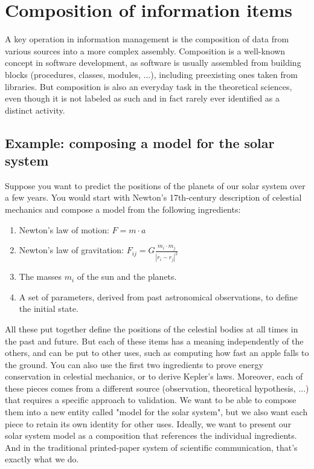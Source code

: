 \section{Composition of information items}
\label{composition}

A key operation in information management is the composition of data from various sources into a more complex assembly. Composition is a well-known concept in software development, as software is usually assembled from building blocks (procedures, classes, modules, ...), including preexisting ones taken from libraries. But composition is also an everyday task in the theoretical sciences, even though it is not labeled as such and in fact rarely ever identified as a distinct activity.

\subsection{Example: composing a model for the solar system}

Suppose you want to predict the positions of the planets of our solar system over a few years. You would start with Newton's 17th-century description of celestial mechanics and compose a model from the following ingredients:

\begin{enumerate}
\item Newton's law of motion:
      $F = m \cdot a$
\item Newton's law of gravitation:
      $F_{ij} = G \frac{m_i \cdot m_j}{|r_i-r_j|^2}$
\item The masses $m_i$ of the sun and the planets.
\item A set of parameters, derived from past astronomical observations, to define the initial state.
\setcounter{myCounter}{\theenumi}
\end{enumerate}

All these put together define the positions of the celestial bodies at all times in the past and future. But each of these items has a meaning independently of the others, and can be put to other uses, such as computing how fast an apple falls to the ground. You can also use the first two ingredients to prove energy conservation in celestial mechanics, or to derive Kepler's laws. Moreover, each of these pieces comes from a different source (observation, theoretical hypothesis, ...) that requires a specific approach to validation. We want to be able to compose them into a new entity called "model for the solar system", but we also want each piece to retain its own identity for other uses. Ideally, we want to present our solar system model as a composition that references the individual ingredients. And in the traditional printed-paper system of scientific communication, that's exactly what we do.

